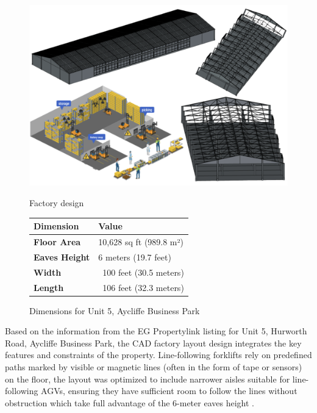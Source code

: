 \documentclass[12pt]{article}
\begin{document}
\begin{figure}[ht]
\centering
\begin{minipage}{0.45\textwidth}
    \centering
    \includegraphics[width=\linewidth]{factory layout1.png}
    \caption{Factory design}
    \label{fig:targeted working condition}
\end{minipage}%
\hfill
\begin{minipage}{0.45\textwidth}
    \centering
    \begin{tabular}{|l|l|}
    \hline
    \textbf{Dimension}      & \textbf{Value}                \\ \hline
    \textbf{Floor Area}      & 10,628 sq ft (989.8 m²)        \\ \hline
    \textbf{Eaves Height}    & 6 meters (19.7 feet)           \\ \hline
    \textbf{Width}           & ~100 feet (30.5 meters)        \\ \hline
    \textbf{Length}          & ~106 feet (32.3 meters)        \\ \hline
    \end{tabular}
    \caption{ Dimensions for Unit 5, Aycliffe Business Park\cite{mileway_hurworth_2024}}
\end{minipage}
\end{figure}



Based on the information from the EG Propertylink listing for Unit 5, Hurworth Road, Aycliffe Business Park\cite{mileway_hurworth_2024}, the CAD factory layout design integrates the key features and constraints of the property.  Line-following forklifts rely on predefined paths marked by visible or magnetic lines (often in the form of tape or sensors) on the floor, the layout was optimized to include narrower aisles suitable for line-following AGVs,  ensuring they have sufficient room to follow the lines without obstruction which take full advantage of the 6-meter eaves height . 
\end{document}

